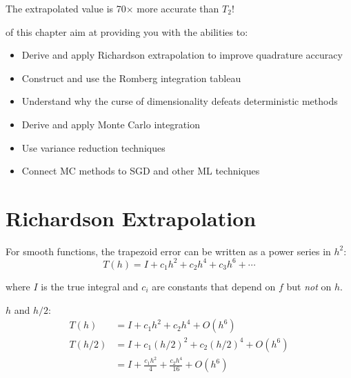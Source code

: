 The extrapolated value is 70$\times$ more accurate than $T_2$!


\vspace{2em}
 of this chapter aim at providing you with the abilities to:
\begin{itemize}
    \item Derive and apply Richardson extrapolation to improve quadrature accuracy
    \item Construct and use the Romberg integration tableau
    \item Understand why the curse of dimensionality defeats deterministic methods
    \item Derive and apply Monte Carlo integration
    \item Use variance reduction techniques
    \item Connect MC methods to SGD and other ML techniques
\end{itemize}





\newpage
\section{Richardson Extrapolation}

 For smooth functions, the trapezoid error can be written as a power series in $h^2$:
\begin{equation}
    T(h) = I + c_1 h^2 + c_2 h^4 + c_3 h^6 + \cdots
\end{equation}

where $I$ is the true integral and $c_i$ are constants that depend on $f$ but \emph{not} on $h$.


 $h$ and $h/2$:
\begin{align}
    T(h) &= I + c_1 h^2 + c_2 h^4 + O(h^6) \\
    T(h/2) &= I + c_1 (h/2)^2 + c_2 (h/2)^4 + O(h^6) \\
    &= I + \frac{c_1 h^2}{4} + \frac{c_2 h^4}{16} + O(h^6)
\end{align}

